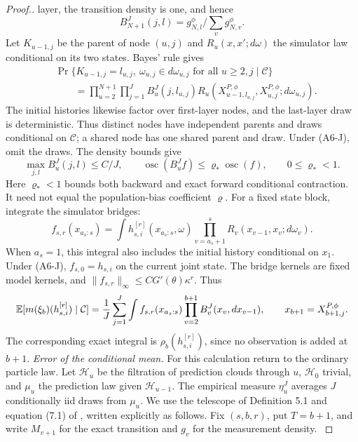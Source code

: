 \documentclass[11pt]{article}
\theoremstyle{thmstylethree}%
\begin{document}
\begin{proof}[Proof.]
{layer, the transition density is one, and hence
\[
B_{N+1}^J(j,l)=g_{N,l}^{\phi}/\sum_v g_{N,v}^{\phi}.
\]
Let $K_{u-1,j}$ be the parent of node $(u,j)$ and $R_u(x,x';d\omega)$
the simulator law conditional on its two states. Bayes' rule gives
\begin{align*}
&\Pr\{K_{u-1,j}=l_{u,j},\ \omega_{u,j}\in d\omega_{u,j}
                 \text{ for all }u\geq2,j\mid\mathcal C\}\\
&\qquad=\prod_{u=2}^{N+1}\prod_{j=1}^J
 B_u^J(j,l_{u,j})
 R_u(X_{u-1,l_{u,j}}^{P,\phi},X_{u,j}^{P,\phi};d\omega_{u,j}).
\end{align*}
The initial histories likewise factor over first-layer nodes, and the
last-layer draw is deterministic. Thus distinct nodes have independent
parents and draws conditional on $\mathcal C$; a shared node has one
shared parent and draw. Under (A6-J), omit the draws.
The density bounds give
\begin{equation}
\max_{j,l}B_u^J(j,l)\leq C/J,\qquad
\operatorname{osc}(B_u^Jf)\leq\varrho_*\operatorname{osc}(f),\qquad 0\leq\varrho_*<1.
\label{eq:logfree-backward-bounds}
\end{equation}
Here $\varrho_*<1$ bounds both backward and exact forward conditional
contraction. It need not equal the population-bias coefficient $\varrho$.
\endgraf
For a fixed state block, integrate the simulator bridges:
\[
f_{s,r}(x_{a_s:s})
=\int h_{s,i}^{[r]}(x_{a_s:s},\omega)
       \prod_{v=a_s+1}^{s}R_v(x_{v-1},x_v;d\omega_v).
\]
When $a_s=1$, this integral also includes the initial history conditional
on $x_1$. Under (A6-J), $f_{s,0}=h_{s,i}$ on the current joint state.
The bridge kernels are fixed model kernels, and
$\|f_{s,r}\|_\infty\leq CG'(\theta)\kappa^r$. Thus
\[
\mathbb{E}[m(\xi_b)(h_{s,i}^{[r]})\mid\mathcal C]
=\frac1J\sum_{j=1}^J\int f_{s,r}(x_{a_s:s})
       \prod_{v=2}^{b+1}B_v^J(x_v,dx_{v-1}),
\qquad x_{b+1}=X_{b+1,j}^{P,\phi}.
\]
The corresponding exact integral is $\rho_b(h_{s,i}^{[r]})$, since
no observation is added at $b+1$.
\endgraf
\emph{Error of the conditional mean.}
For this calculation return to the ordinary particle law. Let
$\mathcal H_u$ be the filtration of prediction clouds through $u$,
$\mathcal H_0$ trivial, and $\mu_u$ the prediction law given
$\mathcal H_{u-1}$. The empirical measure $\eta_u^J$ averages $J$
conditionally iid draws from $\mu_u$.
We use the telescope of Definition 5.1 and equation (7.1) of
\citet{delmoral10backward}, written explicitly as follows.
Fix $(s,b,r)$, put $T=b+1$, and write $M_{v+1}$ for the exact
transition and $g_v$ for the measurement density.
}
\end{proof}
\end{document}
